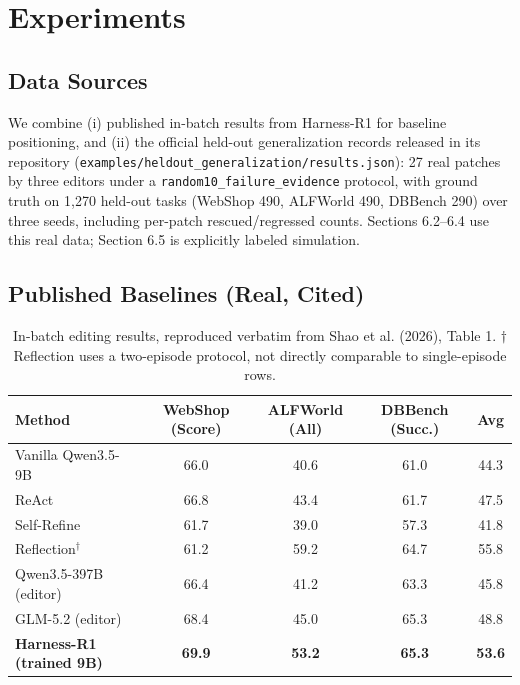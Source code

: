 \documentclass{article}
\begin{document}
\section{Experiments}
\label{sec:experiments}

\subsection{Data Sources}
We combine (i) published in-batch results from Harness-R1 \citep{shao2026harnessr1} for baseline positioning, and (ii) the official held-out generalization records released in its repository (\texttt{examples/heldout\_generalization/results.json}): 27 real patches by three editors under a \texttt{random10\_failure\_evidence} protocol, with ground truth on 1{,}270 held-out tasks (WebShop 490, ALFWorld 490, DBBench 290) over three seeds, including per-patch rescued/regressed counts. Sections 6.2--6.4 use this real data; Section 6.5 is explicitly labeled simulation.

\subsection{Published Baselines (Real, Cited)}

\begin{table}[h]
\centering
\caption{In-batch editing results, reproduced verbatim from Shao et al. (2026), Table 1. $\dagger$Reflection uses a two-episode protocol, not directly comparable to single-episode rows.}
\label{tab:main}
\begin{tabular}{lcccc}
\toprule
\textbf{Method} & \textbf{WebShop (Score)} & \textbf{ALFWorld (All)} & \textbf{DBBench (Succ.)} & \textbf{Avg} \\
\midrule
Vanilla Qwen3.5-9B & 66.0 & 40.6 & 61.0 & 44.3 \\
ReAct & 66.8 & 43.4 & 61.7 & 47.5 \\
Self-Refine & 61.7 & 39.0 & 57.3 & 41.8 \\
Reflection$^\dagger$ & 61.2 & 59.2 & 64.7 & 55.8 \\
Qwen3.5-397B (editor) & 66.4 & 41.2 & 63.3 & 45.8 \\
GLM-5.2 (editor) & 68.4 & 45.0 & 65.3 & 48.8 \\
\textbf{Harness-R1 (trained 9B)} & \textbf{69.9} & \textbf{53.2} & \textbf{65.3} & \textbf{53.6} \\
\bottomrule
\end{tabular}
\end{table}
\end{document}
